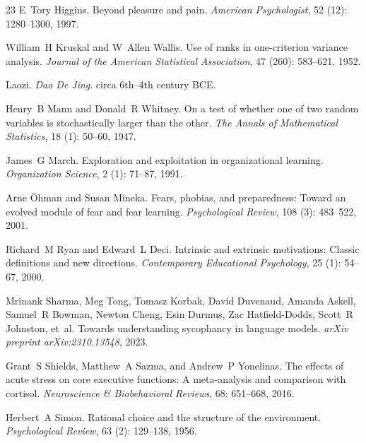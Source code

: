 \documentclass[11pt]{article}
\begin{document}
\begin{thebibliography}{23}
E~Tory Higgins.
\newblock Beyond pleasure and pain.
\newblock \emph{American Psychologist}, 52 (12): 1280--1300, 1997.

William~H Kruskal and W~Allen Wallis.
\newblock Use of ranks in one-criterion variance analysis.
\newblock \emph{Journal of the American Statistical Association}, 47 (260): 583--621, 1952.

Laozi.
\newblock \emph{Dao De Jing}.
\newblock circa 6th--4th century BCE.

Henry~B Mann and Donald~R Whitney.
\newblock On a test of whether one of two random variables is stochastically larger than the other.
\newblock \emph{The Annals of Mathematical Statistics}, 18 (1): 50--60, 1947.

James~G March.
\newblock Exploration and exploitation in organizational learning.
\newblock \emph{Organization Science}, 2 (1): 71--87, 1991.

Arne {\"O}hman and Susan Mineka.
\newblock Fears, phobias, and preparedness: Toward an evolved module of fear and fear learning.
\newblock \emph{Psychological Review}, 108 (3): 483--522, 2001.

Richard~M Ryan and Edward~L Deci.
\newblock Intrinsic and extrinsic motivations: Classic definitions and new directions.
\newblock \emph{Contemporary Educational Psychology}, 25 (1): 54--67, 2000.

Mrinank Sharma, Meg Tong, Tomasz Korbak, David Duvenaud, Amanda Askell, Samuel~R Bowman, Newton Cheng, Esin Durmus, Zac Hatfield-Dodds, Scott~R Johnston, et~al.
\newblock Towards understanding sycophancy in language models.
\newblock \emph{arXiv preprint arXiv:2310.13548}, 2023.

Grant~S Shields, Matthew~A Sazma, and Andrew~P Yonelinas.
\newblock The effects of acute stress on core executive functions: A meta-analysis and comparison with cortisol.
\newblock \emph{Neuroscience \& Biobehavioral Reviews}, 68: 651--668, 2016.

Herbert~A Simon.
\newblock Rational choice and the structure of the environment.
\newblock \emph{Psychological Review}, 63 (2): 129--138, 1956.


\end{thebibliography}
\end{document}
